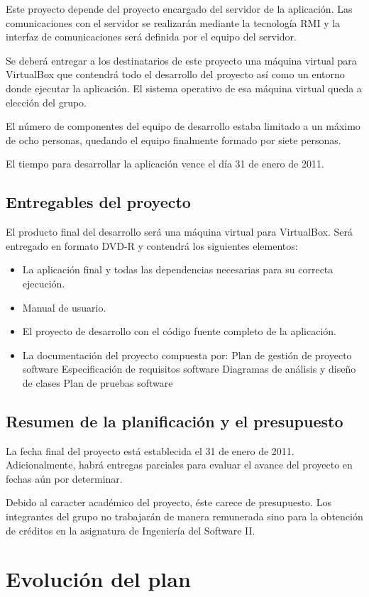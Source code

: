 Este proyecto depende del proyecto encargado del servidor de la aplicación. Las
comunicaciones con el servidor se realizarán mediante la tecnología RMI y la
interfaz de comunicaciones será definida por el equipo del servidor.

Se deberá entregar a los destinatarios de este proyecto una máquina virtual
para VirtualBox que contendrá todo el desarrollo del proyecto así como un
entorno donde ejecutar la aplicación. El sistema operativo de esa máquina
virtual queda a elección del grupo.

El número de componentes del equipo de desarrollo estaba limitado a un máximo
de ocho personas, quedando el equipo finalmente formado por siete personas.

El tiempo para desarrollar la aplicación vence el día 31 de enero de 2011.

\subsection{Entregables del proyecto}

El producto final del desarrollo será una máquina virtual para VirtualBox. Será
entregado en formato DVD-R y contendrá los siguientes elementos:
\begin{itemize}
\item La aplicación final y todas las dependencias necesarias para su correcta
ejecución.
\item Manual de usuario.
\item El proyecto de desarrollo con el código fuente completo de la aplicación.
\item La documentación del proyecto compuesta por:
\subitem Plan de gestión de proyecto software
\subitem Especificación de requisitos software
\subitem Diagramas de análisis y diseño de clases
\subitem Plan de pruebas software
\end{itemize}

\subsection{Resumen de la planificación y el presupuesto}

La fecha final del proyecto está establecida el 31 de enero de 2011.
Adicionalmente, habrá entregas parciales para evaluar el avance del proyecto en
fechas aún por determinar.

Debido al caracter académico del proyecto, éste carece de presupuesto. Los
integrantes del grupo no trabajarán de manera remunerada sino para la obtención
de créditos en la asignatura de Ingeniería del Software II.

\section{Evolución del plan}
